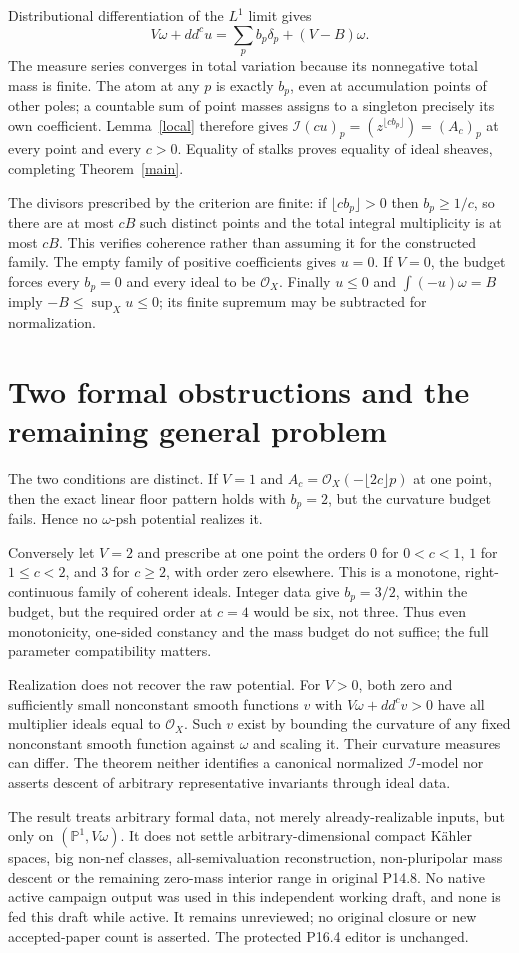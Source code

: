 \documentclass[11pt]{article}
\newcommand{\PP}{\mathbb P}
\newcommand{\OO}{\mathcal O}
\newcommand{\II}{\mathcal I}
\begin{document}
Distributional differentiation of the $L^1$ limit gives
\[
 V\omega+dd^cu=\sum_p b_p\delta_p+(V-B)\omega.
\]
The measure series converges in total variation because its nonnegative total mass is finite. The atom at any $p$ is exactly $b_p$, even at accumulation points of other poles; a countable sum of point masses assigns to a singleton precisely its own coefficient. Lemma~\ref{local} therefore gives $\II(cu)_p=(z^{\lfloor cb_p\rfloor})=(A_c)_p$ at every point and every $c>0$. Equality of stalks proves equality of ideal sheaves, completing Theorem~\ref{main}.

The divisors prescribed by the criterion are finite: if $\lfloor cb_p\rfloor>0$ then $b_p\geq1/c$, so there are at most $cB$ such distinct points and the total integral multiplicity is at most $cB$. This verifies coherence rather than assuming it for the constructed family. The empty family of positive coefficients gives $u=0$. If $V=0$, the budget forces every $b_p=0$ and every ideal to be $\OO_X$. Finally $u\leq0$ and $\int(-u)\omega=B$ imply $-B\leq\sup_Xu\leq0$; its finite supremum may be subtracted for normalization.

\section{Two formal obstructions and the remaining general problem}
The two conditions are distinct. If $V=1$ and $A_c=\OO_X(-\lfloor2c\rfloor p)$ at one point, then the exact linear floor pattern holds with $b_p=2$, but the curvature budget fails. Hence no $\omega$-psh potential realizes it.

Conversely let $V=2$ and prescribe at one point the orders $0$ for $0<c<1$, $1$ for $1\leq c<2$, and $3$ for $c\geq2$, with order zero elsewhere. This is a monotone, right-continuous family of coherent ideals. Integer data give $b_p=3/2$, within the budget, but the required order at $c=4$ would be six, not three. Thus even monotonicity, one-sided constancy and the mass budget do not suffice; the full parameter compatibility matters.

Realization does not recover the raw potential. For $V>0$, both zero and sufficiently small nonconstant smooth functions $v$ with $V\omega+dd^cv>0$ have all multiplier ideals equal to $\OO_X$. Such $v$ exist by bounding the curvature of any fixed nonconstant smooth function against $\omega$ and scaling it. Their curvature measures can differ. The theorem neither identifies a canonical normalized $\II$-model nor asserts descent of arbitrary representative invariants through ideal data.

The result treats arbitrary formal data, not merely already-realizable inputs, but only on $(\PP^1,V\omega)$. It does not settle arbitrary-dimensional compact K\"ahler spaces, big non-nef classes, all-semivaluation reconstruction, non-pluripolar mass descent or the remaining zero-mass interior range in original P14.8. No native active campaign output was used in this independent working draft, and none is fed this draft while active. It remains unreviewed; no original closure or new accepted-paper count is asserted. The protected P16.4 editor is unchanged.
\end{document}
